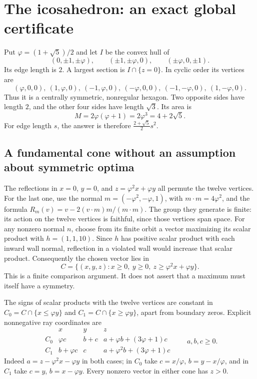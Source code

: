 \section{The icosahedron: an exact global certificate}
Put $\varphi=(1+\sqrt5)/2$ and let $I$ be the convex hull of
\[
 (0,\pm1,\pm\varphi),\qquad(\pm1,\pm\varphi,0),\qquad
 (\pm\varphi,0,\pm1).
\]
Its edge length is $2$. A largest section is $I\cap\{z=0\}$. In cyclic
order its vertices are
\[
 (\varphi,0,0),\ (1,\varphi,0),\ (-1,\varphi,0),\
 (-\varphi,0,0),\ (-1,-\varphi,0),\ (1,-\varphi,0).
\]
Thus it is a centrally symmetric, nonregular hexagon. Two opposite sides
have length $2$, and the other four sides have length $\sqrt3$. Its area is
\[
 M=2\varphi(\varphi+1)=2\varphi^3=4+2\sqrt5.
\]
For edge length $s$, the answer is therefore
$\frac{2+\sqrt5}{2}s^2$.

\subsection{A fundamental cone without an assumption about symmetric optima}
The reflections in $x=0$, $y=0$, and
$z=\varphi^2x+\varphi y$ all permute the twelve vertices. For the last one,
use the normal $m=(-\varphi^2,-\varphi,1)$, with
$m\cdot m=4\varphi^2$, and the formula
$R_m(v)=v-2(v\cdot m)m/(m\cdot m)$.
The group they generate is finite: its action on the twelve vertices is
faithful, since those vertices span space. For any nonzero normal $n$,
choose from its finite orbit a vector maximizing its scalar product with
$h=(1,1,10)$. Since $h$ has positive scalar product with each inward
wall normal, reflection in a violated wall would increase that scalar
product. Consequently the chosen vector lies in
\[
 C=\{(x,y,z):x\ge0,\ y\ge0,\ z\ge\varphi^2x+\varphi y\}.
\]
This is a finite comparison argument. It does not assert that a maximum
must itself have a symmetry.

The signs of scalar products with the twelve vertices are constant in
$C_0=C\cap\{x\le\varphi y\}$ and
$C_1=C\cap\{x\ge\varphi y\}$, apart from boundary zeros. Explicit
nonnegative ray coordinates are
\[
\begin{array}{c|ccc}
 &x&y&z\\\hline
C_0&\varphi c&b+c&a+\varphi b+(3\varphi+1)c\\
C_1&b+\varphi c&c&a+\varphi^2b+(3\varphi+1)c
\end{array}
\qquad a,b,c\ge0.
\]
Indeed $a=z-\varphi^2x-\varphi y$ in both cases; in $C_0$ take
$c=x/\varphi$, $b=y-x/\varphi$, and in $C_1$ take $c=y$,
$b=x-\varphi y$. Every nonzero vector in either cone has $z>0$.

